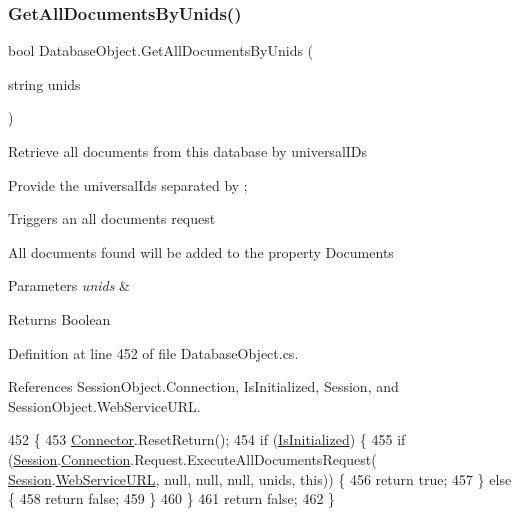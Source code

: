 \subsubsection{\texorpdfstring{Get\+All\+Documents\+By\+Unids()}{GetAllDocumentsByUnids()}\hspace{0.1cm}{\footnotesize\ttfamily [1/2]}}
{\footnotesize\ttfamily bool Database\+Object.\+Get\+All\+Documents\+By\+Unids (\begin{DoxyParamCaption}\item[{string}]{unids }\end{DoxyParamCaption})}



Retrieve all documents from this database by universal\+I\+Ds 

Provide the universal\+Ids separated by ;

Triggers an all documents request

All documents found will be added to the property \textquotesingle{}Documents\textquotesingle{}


\begin{DoxyParams}{Parameters}
{\em unids} & \\
\hline
\end{DoxyParams}
\begin{DoxyReturn}{Returns}
Boolean
\end{DoxyReturn}


Definition at line 452 of file Database\+Object.\+cs.



References Session\+Object.\+Connection, Is\+Initialized, Session, and Session\+Object.\+Web\+Service\+U\+RL.


\begin{DoxyCode}
452                                                      \{
453         \mbox{\hyperlink{class_connector}{Connector}}.ResetReturn();
454         \textcolor{keywordflow}{if} (\mbox{\hyperlink{class_database_object_a5fe036d32a30eb10d1b3f6a30263f740}{IsInitialized}}) \{
455             \textcolor{keywordflow}{if} (\mbox{\hyperlink{class_database_object_aa8484162b7d2a7c4c9426bca13c64c07}{Session}}.\mbox{\hyperlink{class_session_object_a014bdbf705a753540e19bfb53030c55c}{Connection}}.Request.ExecuteAllDocumentsRequest(
      \mbox{\hyperlink{class_database_object_aa8484162b7d2a7c4c9426bca13c64c07}{Session}}.\mbox{\hyperlink{class_session_object_a697c071c812fbf7ad1166b896fb44c16}{WebServiceURL}}, null, null, null, unids, \textcolor{keyword}{this})) \{
456                 \textcolor{keywordflow}{return} \textcolor{keyword}{true};
457             \} \textcolor{keywordflow}{else} \{
458                 \textcolor{keywordflow}{return} \textcolor{keyword}{false};
459             \}
460         \}
461         \textcolor{keywordflow}{return} \textcolor{keyword}{false};
462     \}
\end{DoxyCode}
\mbox{\label{class_database_object_a92e80ea30e83cddf47f29d0f502b81c5}} 
